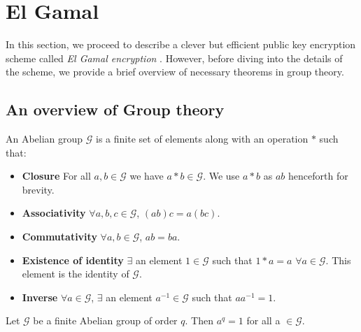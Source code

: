 \section{El Gamal}

\label{sec:elgamal} 

In this section, we proceed to describe a clever but efficient public key encryption scheme called \textit{El Gamal encryption} \cite{Elgamal_1985}. 
However, before diving into the details of the scheme, we provide a brief overview of necessary theorems in group theory.

\subsection{An overview of Group theory}

\begin{definition}
An Abelian group $ \mathcal{G} $ is a finite set of elements along with an operation $ * $ such that:

\begin{itemize}
    \item \textbf{Closure} For all $ a, b \in \mathcal{G} $ we have $ a * b \in \mathcal{G} $. We use $ a * b $ as $ ab $ henceforth for brevity.
    \item \textbf{Associativity} $ \forall a, b, c \in \mathcal{G} $, $ (ab)c = a(bc) $.
    \item \textbf{Commutativity} $ \forall a, b \in \mathcal{G} $, $ ab = ba $.
    \item \textbf{Existence of identity} $ \exists $ an element $ 1 \in \mathcal{G} $ such that $ 1 * a = a $ $ \forall a \in \mathcal{G} $. This element is the identity of $ \mathcal{G} $.
    \item \textbf{Inverse} $ \forall a \in \mathcal{G}$, $ \exists $ an element $ a^{-1} \in \mathcal{G} $ such that $ aa^{-1} = 1 $.
\end{itemize}
\end{definition}

\begin{theorem}
Let $\mathcal{G}$ be a finite Abelian group of order $ q $. Then $ a^q = 1 $ for all a $\in \mathcal{G}$.
\end{theorem}

